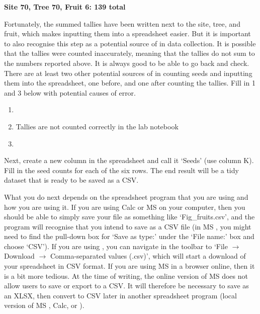 \documentclass[
  openany]{krantz}
\providecommand{\tightlist}{%
  \setlength{\itemsep}{0pt}\setlength{\parskip}{0pt}}
\begin{document}
\textbf{Site 70, Tree 70, Fruit 6: 139 total}

\StrokeFive\StrokeFive\StrokeFive\StrokeFive\StrokeFive\StrokeFive\StrokeFive\StrokeFive\StrokeFive\StrokeFive\StrokeFive\StrokeFive\StrokeFive\StrokeFive\StrokeFive\StrokeFive\StrokeFive\StrokeFive\StrokeFive\StrokeFive

\StrokeFive\StrokeFive\StrokeFive\StrokeFive\StrokeFive\StrokeFive\StrokeFive\StrokeFour

Fortunately, the summed tallies have been written next to the site, tree, and fruit, which makes inputting them into a spreadsheet easier.
But it is important to also recognise this step as a potential source of  in data collection.
It is possible that the tallies were counted inaccurately, meaning that the tallies do not sum to the numbers reported above.
It is always good to be able to go back and check.
There are at least two other potential sources of  in counting seeds and inputting them into the spreadsheet, one before, and one after counting the tallies.
Fill in 1 and 3 below with potential causes of error.

\begin{enumerate}
\def\labelenumi{\arabic{enumi}.}
\tightlist
\item
\item
  Tallies are not counted correctly in the lab notebook
\item
\end{enumerate}

Next, create a new column in the spreadsheet and call it `Seeds' (use column K).
Fill in the seed counts for each of the six rows.
The end result will be a tidy dataset that is ready to be saved as a CSV.

What you do next depends on the spreadsheet program that you are using and how you are using it.
If you are using  Calc or MS  on your computer, then you should be able to simply save your file as something like `Fig\_fruits.csv', and the program will recognise that you intend to save as a CSV file (in MS , you might need to find the pull-down box for `Save as type:' under the `File name:' box and choose `CSV').
If you are using , you can navigate in the toolbar to `File \(\to\) Download \(\to\) Comma-separated values (.csv)', which will start a download of your spreadsheet in CSV format.
If you are using MS  in a browser online, then it is a bit more tedious.
At the time of writing, the online version of MS  does not allow users to save or export to a CSV.
It will therefore be necessary to save as an XLSX, then convert to CSV later in another spreadsheet program (local version of MS ,  Calc, or ).
\end{document}
